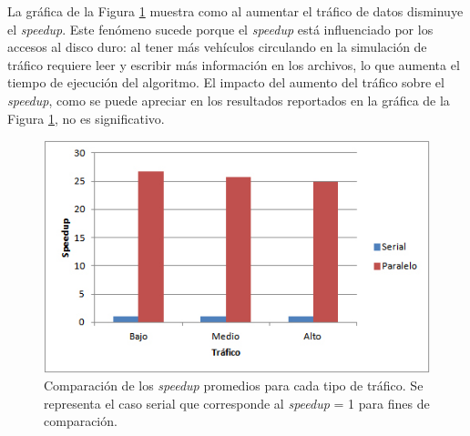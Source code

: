 La gráfica de la Figura \ref{fig:speedup1} muestra como al aumentar el tráfico de datos disminuye el \emph{speedup}. Este fenómeno sucede porque el \emph{speedup} está influenciado por los accesos al disco duro: al tener más vehículos circulando en la simulación de tráfico requiere leer y escribir más información en los archivos, lo que aumenta el tiempo de ejecución del algoritmo. El impacto del aumento del tráfico sobre el \emph{speedup}, como se puede apreciar en los resultados reportados en la gráfica de la Figura \ref{fig:speedup1}, no es significativo.

\begin{figure}[ht]
	\centering
	\includegraphics[width=0.8\linewidth]{Figures/speedup1}
	\caption[Comparación de los \emph{speedup} promedios para cada tipo de tráfico.]{Comparación de los \emph{speedup} promedios para cada tipo de tráfico. Se representa el caso serial que corresponde al \emph{speedup} = 1 para fines de comparación.}
	\label{fig:speedup1}
\end{figure}
